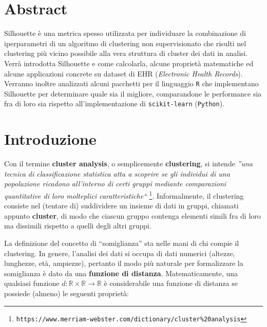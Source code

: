 \documentclass[a4paper, 12pt]{report}
\begin{document}
	\tableofcontents
	\thispagestyle{empty}

	\listoffigures
	\thispagestyle{empty}
	\clearpage

	\setcounter{page}{1}

	\chapter*{Abstract}

		Silhouette è una metrica spesso utilizzata per individuare
		la combinazione di iperparametri di un algoritmo di clustering
		non supervisionato che risulti nel clustering più vicino possibile
		alla vera struttura di cluster dei dati in analisi. Verrà introdotta
		Silhouette e come calcolarla, alcune proprietà matematiche ed alcune
		applicazioni concrete su dataset di EHR (\textit{Electronic Health
		Records}). Verranno inoltre analizzati alcuni pacchetti per il
		linguaggio \texttt{R} che implementano Silhouette per determinare
		quale sia il migliore, comparandone le performance sia fra di
		loro sia rispetto all'implementazione di \texttt{scikit-learn}
		(\texttt{Python}).

	\chapter{Introduzione}

		Con il termine \textbf{cluster analysis}, o semplicemente
		\textbf{clustering}, si intende \emph{''una tecnica di
		classificazione statistica atta a scoprire se gli individui
		di una popolazione ricadono all'interno di certi gruppi mediante
		comparazioni quantitative di loro molteplici caratteristiche``}
		\footnote{\texttt{https://www.merriam-webster.com/dictionary/cluster\%20analysis}}.
		Informalmente, il clustering consiste nel (tentare di) suddividere
		un insieme di dati in gruppi, chiamati appunto \textbf{cluster},
		di modo che ciascun gruppo contenga elementi simili fra di loro
		ma dissimili rispetto a quelli degli altri gruppi.

		La definizione del concetto di ``somiglianza'' sta nelle mani di
		chi compie il clustering. In genere, l'analisi dei dati si occupa
		di dati numerici (altezze, lunghezze, età, ampiezze), pertanto il
		modo più naturale per formalizzare la somiglianza è dato da una
		\textbf{funzione di distanza}. Matematicamente, una qualsiasi
		funzione $d: \mathbb{R} \times \mathbb{R} \rightarrow \mathbb{R}$
		è considerabile una funzione di distanza se possiede (almeno) le
		seguenti proprietà:
\end{document}
